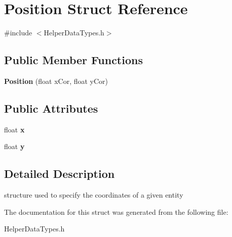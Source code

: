 \hypertarget{structPosition}{}\section{Position Struct Reference}
\label{structPosition}


{\ttfamily \#include $<$Helper\+Data\+Types.\+h$>$}

\subsection*{Public Member Functions}
\begin{DoxyCompactItemize}
\item 
\mbox{\label{structPosition_a2846e4a9e095a0f98f5be27936af63db}} 
{\bfseries Position} (float x\+Cor, float y\+Cor)
\end{DoxyCompactItemize}
\subsection*{Public Attributes}
\begin{DoxyCompactItemize}
\item 
\mbox{\label{structPosition_af684446cbf0f6d53386686283da6dcc6}} 
float {\bfseries x}
\item 
\mbox{\label{structPosition_a54a6182b5f7539295b32255808897d3f}} 
float {\bfseries y}
\end{DoxyCompactItemize}


\subsection{Detailed Description}
structure used to specify the coordinates of a given entity 

The documentation for this struct was generated from the following file\+:\begin{DoxyCompactItemize}
\item 
Helper\+Data\+Types.\+h\end{DoxyCompactItemize}
